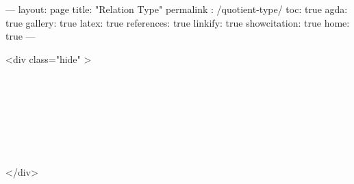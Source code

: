 ---
layout: page
title: "Relation Type"
permalink : /quotient-type/
toc: true
agda: true
gallery: true
latex: true
references: true
linkify: true
showcitation: true
home: true
---

<div class="hide" >
\begin{code}%
\>[0]\AgdaSymbol{\{-\#}\AgdaSpace{}%
\AgdaSpace{}%
\AgdaSpace{}%
\AgdaSymbol{\#-\}}\<%
\\
\>[0]\AgdaSpace{}%
\AgdaSpace{}%
\<%
\\
\>[0]\AgdaSpace{}%
\AgdaSpace{}%
\<%
\\
%
\\[\AgdaEmptyExtraSkip]%
\>[0]\AgdaSpace{}%
\AgdaSpace{}%
\<%
\\
\>[0]\AgdaSpace{}%
\AgdaSpace{}%
\<%
\\
\>[0]\AgdaSpace{}%
\AgdaSpace{}%
\<%
\end{code}
</div>

